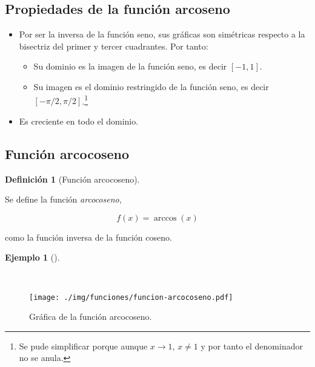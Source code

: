 \documentclass[
  a4paper,
]{scrreport}
\providecommand{\tightlist}{%
  \setlength{\itemsep}{0pt}\setlength{\parskip}{0pt}}\usepackage{longtable,booktabs,array}
\theoremstyle{definition}
\theoremstyle{definition}
\newtheorem{example}{Ejemplo}[chapter]
\theoremstyle{definition}
\newtheorem{definition}{Definición}[chapter]
\theoremstyle{plain}
\theoremstyle{plain}
\theoremstyle{plain}
\theoremstyle{remark}
\begin{document}
\subsection{Propiedades de la función
arcoseno}\label{propiedades-de-la-funciuxf3n-arcoseno}

\begin{itemize}
\tightlist
\item
  Por ser la inversa de la función seno, sus gráficas son simétricas
  respecto a la bisectriz del primer y tercer cuadrantes. Por tanto:

  \begin{itemize}
  \tightlist
  \item
    Su dominio es la imagen de la función seno, es decir \([-1,1]\).
  \item
    Su imagen es el dominio restringido de la función seno, es decir
    \([-\pi/2,\pi/2]\).\footnote{Se pude simplificar porque aunque
      \(x\to 1\), \(x\neq 1\) y por tanto el denominador no se anula.}
  \end{itemize}
\item
  Es creciente en todo el dominio.
\end{itemize}

\subsection{Función arcocoseno}\label{funciuxf3n-arcocoseno}

\begin{definition}[Función
arcocoseno]\protect\hypertarget{def-funcion-arcocoseno}{}\label{def-funcion-arcocoseno}

Se define la función \emph{arcocoseno},

\[f(x)=\operatorname{arccos}(x)\]

como la función inversa de la función coseno.

\end{definition}

\begin{example}[]\protect\hypertarget{exm-funcion-arcocoseno}{}\label{exm-funcion-arcocoseno}

~

\begin{figure}[H]

{\centering \texttt{[image: ./img/funciones/funcion-arcocoseno.pdf]}

}

\caption{Gráfica de la función arcocoseno.}

\end{figure}%

\end{example}
\end{document}
